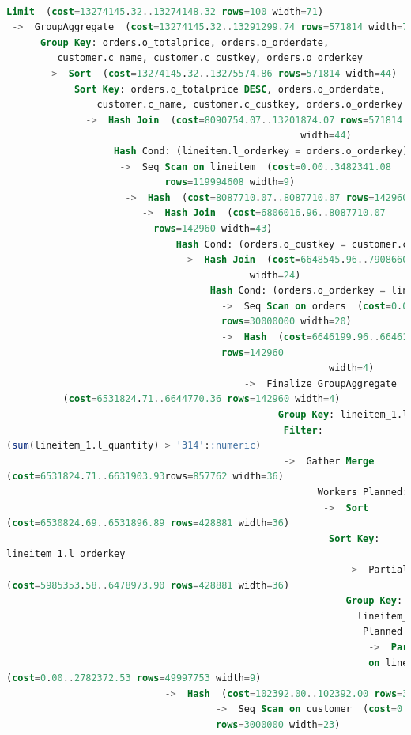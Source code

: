 \documentclass{article}
\begin{document}
\begin{lstlisting}[language=SQL]
  
Limit  (cost=13274145.32..13274148.32 rows=100 width=71)
 ->  GroupAggregate  (cost=13274145.32..13291299.74 rows=571814 width=71)
      Group Key: orders.o_totalprice, orders.o_orderdate,
         customer.c_name, customer.c_custkey, orders.o_orderkey
       ->  Sort  (cost=13274145.32..13275574.86 rows=571814 width=44)
            Sort Key: orders.o_totalprice DESC, orders.o_orderdate, 
                customer.c_name, customer.c_custkey, orders.o_orderkey
              ->  Hash Join  (cost=8090754.07..13201874.07 rows=571814 
                                                    width=44)
                   Hash Cond: (lineitem.l_orderkey = orders.o_orderkey)
                    ->  Seq Scan on lineitem  (cost=0.00..3482341.08 
                            rows=119994608 width=9)
                     ->  Hash  (cost=8087710.07..8087710.07 rows=142960 width=43)
                        ->  Hash Join  (cost=6806016.96..8087710.07 
                          rows=142960 width=43)
                              Hash Cond: (orders.o_custkey = customer.c_custkey)
                               ->  Hash Join  (cost=6648545.96..7908660.97 rows=142960
                                           width=24)
                                    Hash Cond: (orders.o_orderkey = lineitem_1.l_orderkey)
                                      ->  Seq Scan on orders  (cost=0.00..829242.00 
                                      rows=30000000 width=20)
                                      ->  Hash  (cost=6646199.96..6646199.96 
                                      rows=142960
                                                         width=4)
                                          ->  Finalize GroupAggregate  
          (cost=6531824.71..6644770.36 rows=142960 width=4)
                                                Group Key: lineitem_1.l_orderkey
                                                 Filter: 
(sum(lineitem_1.l_quantity) > '314'::numeric)
                                                 ->  Gather Merge  
(cost=6531824.71..6631903.93rows=857762 width=36)
                                                       Workers Planned: 2
                                                        ->  Sort  
(cost=6530824.69..6531896.89 rows=428881 width=36)
                                                         Sort Key: 
lineitem_1.l_orderkey
                                                            ->  Partial HashAggregate 
(cost=5985353.58..6478973.90 rows=428881 width=36)
                                                            Group Key: 
                                                              lineitem_1.l_orderkey
                                                               Planned Partitions: 64
                                                                ->  Parallel Seq Scan 
                                                                on lineitem lineitem_1
(cost=0.00..2782372.53 rows=49997753 width=9)
                            ->  Hash  (cost=102392.00..102392.00 rows=3000000 width=23)
                                     ->  Seq Scan on customer  (cost=0.00..102392.00 
                                     rows=3000000 width=23)
  

\end{lstlisting}
\end{document}
